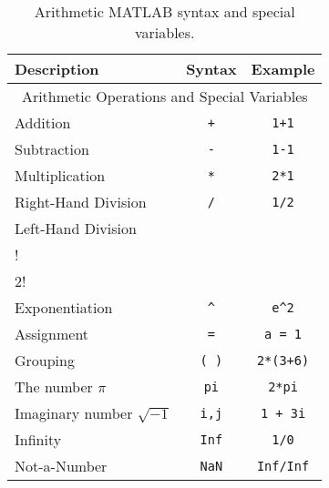 \begin{table}%
	\centering
	\begin{tabularx}{3.2in}{lcc}
	\toprule
		Description & Syntax & Example \\
	\midrule
		 \multicolumn{3}{c}{Arithmetic Operations and Special Variables}\\
	\midrule
		Addition & {\lstinline[style=Matlab-editor]!+!} & {\lstinline[style=Matlab-editor]!1+1!} \\
		Subtraction & {\lstinline[style=Matlab-editor]!-!} & {\lstinline[style=Matlab-editor]!1-1!} \\
		Multiplication & {\lstinline[style=Matlab-editor]!*!} & {\lstinline[style=Matlab-editor]!2*1!} \\
		Right-Hand Division & {\lstinline[style=Matlab-editor]!/!} & {\lstinline[style=Matlab-editor]!1/2!} \\
		Left-Hand Division & {\lstinline[style=Matlab-editor]!\\!} & {\lstinline[style=Matlab-editor]!1\\2!} \\
		Exponentiation & {\lstinline[style=Matlab-editor]!^!} & {\lstinline[style=Matlab-editor]!e^2!} \\
		Assignment & {\lstinline[style=Matlab-editor]!=!} & {\lstinline[style=Matlab-editor]!a = 1!} \\
		Grouping & {\lstinline[style=Matlab-editor]!( )!} & {\lstinline[style=Matlab-editor]!2*(3+6)!} \\
		The number $\pi$ & {\lstinline[style=Matlab-editor]!pi!} & {\lstinline[style=Matlab-editor]!2*pi!} \\
		Imaginary number $\sqrt{-1}$ & {\lstinline[style=Matlab-editor]!i,j!} & {\lstinline[style=Matlab-editor]!1 + 3i!} \\
		Infinity & {\lstinline[style=Matlab-editor]!Inf!} & {\lstinline[style=Matlab-editor]!1/0!} \\
		Not-a-Number & {\lstinline[style=Matlab-editor]!NaN!} & {\lstinline[style=Matlab-editor]!Inf/Inf!} \\
	\midrule
	\end{tabularx}
	\caption{Arithmetic MATLAB syntax and special variables.}
	\label{tab:ArthmeticMATLABSyntax}
\end{table}